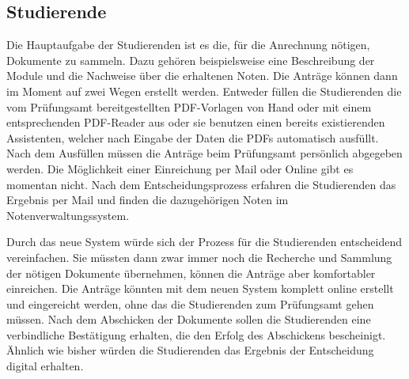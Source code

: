 \subsection{Studierende}

Die Hauptaufgabe der Studierenden ist es die, für die Anrechnung nötigen, Dokumente zu sammeln. Dazu gehören beispielsweise eine Beschreibung der Module und die Nachweise über die erhaltenen Noten. Die Anträge können dann im Moment auf zwei Wegen erstellt werden. Entweder füllen die Studierenden die vom Prüfungsamt bereitgestellten PDF-Vorlagen von Hand oder mit einem entsprechenden PDF-Reader aus oder sie benutzen einen bereits existierenden Assistenten, welcher nach Eingabe der Daten die PDFs automatisch ausfüllt. Nach dem Ausfüllen müssen die Anträge beim Prüfungsamt persönlich abgegeben werden. Die Möglichkeit einer Einreichung per Mail oder Online gibt es momentan nicht. Nach dem Entscheidungsprozess erfahren die Studierenden das Ergebnis per Mail und finden die dazugehörigen Noten im Notenverwaltungssystem.

Durch das neue System würde sich der Prozess für die Studierenden entscheidend vereinfachen. Sie müssten dann zwar immer noch die Recherche und Sammlung der nötigen Dokumente übernehmen, können die Anträge aber komfortabler einreichen. Die Anträge könnten mit dem neuen System komplett online erstellt und eingereicht werden, ohne das die Studierenden zum Prüfungsamt gehen müssen. Nach dem Abschicken der Dokumente sollen die Studierenden eine verbindliche Bestätigung erhalten, die den Erfolg des Abschickens bescheinigt. Ähnlich wie bisher würden die Studierenden das Ergebnis der Entscheidung digital erhalten.